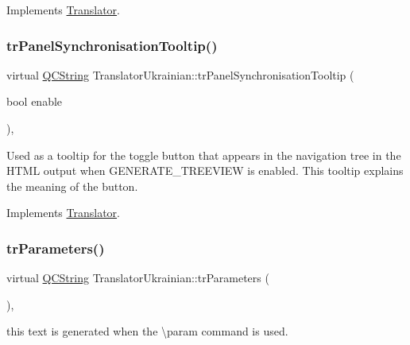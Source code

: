 Implements \mbox{\hyperlink{class_translator}{Translator}}.

\mbox{\label{class_translator_ukrainian_a93af584a0ed0f80b5bfc2ada251c3873}} 
\subsubsection{\texorpdfstring{trPanelSynchronisationTooltip()}{trPanelSynchronisationTooltip()}}
{\footnotesize\ttfamily virtual \mbox{\hyperlink{class_q_c_string}{Q\+C\+String}} Translator\+Ukrainian\+::tr\+Panel\+Synchronisation\+Tooltip (\begin{DoxyParamCaption}\item[{bool}]{enable }\end{DoxyParamCaption})\hspace{0.3cm}{\ttfamily [inline]}, {\ttfamily [virtual]}}

Used as a tooltip for the toggle button that appears in the navigation tree in the H\+T\+ML output when G\+E\+N\+E\+R\+A\+T\+E\+\_\+\+T\+R\+E\+E\+V\+I\+EW is enabled. This tooltip explains the meaning of the button. 

Implements \mbox{\hyperlink{class_translator}{Translator}}.

\mbox{\label{class_translator_ukrainian_a8d624284478f93ab50ca59f4df71d23d}} 
\subsubsection{\texorpdfstring{trParameters()}{trParameters()}}
{\footnotesize\ttfamily virtual \mbox{\hyperlink{class_q_c_string}{Q\+C\+String}} Translator\+Ukrainian\+::tr\+Parameters (\begin{DoxyParamCaption}{ }\end{DoxyParamCaption})\hspace{0.3cm}{\ttfamily [inline]}, {\ttfamily [virtual]}}

this text is generated when the \textbackslash{}param command is used. 

